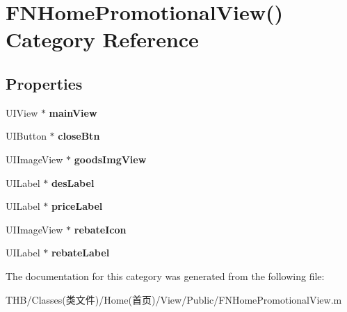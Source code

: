 \hypertarget{category_f_n_home_promotional_view_07_08}{}\section{F\+N\+Home\+Promotional\+View() Category Reference}
\label{category_f_n_home_promotional_view_07_08}
\subsection*{Properties}
\begin{DoxyCompactItemize}
\item 
\mbox{\label{category_f_n_home_promotional_view_07_08_a55c33b654ed9bc4d821f21fa1b10a9e9}} 
U\+I\+View $\ast$ {\bfseries main\+View}
\item 
\mbox{\label{category_f_n_home_promotional_view_07_08_ad9802494790c5a46575ff105b1cc383b}} 
U\+I\+Button $\ast$ {\bfseries close\+Btn}
\item 
\mbox{\label{category_f_n_home_promotional_view_07_08_a4ffcd55e9a584e6958dcd6100df002db}} 
U\+I\+Image\+View $\ast$ {\bfseries goods\+Img\+View}
\item 
\mbox{\label{category_f_n_home_promotional_view_07_08_aa80625005ef3de72f37f2c6eea92e9b5}} 
U\+I\+Label $\ast$ {\bfseries des\+Label}
\item 
\mbox{\label{category_f_n_home_promotional_view_07_08_a255e64207992eeb516e40a1e5f2299ca}} 
U\+I\+Label $\ast$ {\bfseries price\+Label}
\item 
\mbox{\label{category_f_n_home_promotional_view_07_08_a3cd0727046def2b63b68491541253ad8}} 
U\+I\+Image\+View $\ast$ {\bfseries rebate\+Icon}
\item 
\mbox{\label{category_f_n_home_promotional_view_07_08_a7c953880530b16ef5c56f88ca0da62a6}} 
U\+I\+Label $\ast$ {\bfseries rebate\+Label}
\end{DoxyCompactItemize}


The documentation for this category was generated from the following file\+:\begin{DoxyCompactItemize}
\item 
T\+H\+B/\+Classes(类文件)/\+Home(首页)/\+View/\+Public/F\+N\+Home\+Promotional\+View.\+m\end{DoxyCompactItemize}
